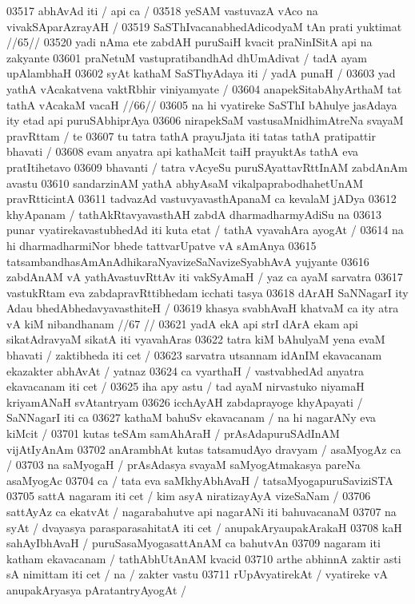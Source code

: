 03517 abhAvAd iti / api ca /  
03518 	yeSAM vastuvazA vAco na vivakSAparAzrayAH /
03519 	SaSThIvacanabhedAdicodyaM tAn prati yuktimat //65// 
03520 yadi nAma ete zabdAH puruSaiH kvacit praNinISitA api na zakyante
03601 praNetuM vastupratibandhAd dhUmAdivat / tadA ayam upAlambhaH  
03602 syAt kathaM SaSThyAdaya iti / yadA punaH / 
03603 	yad yathA vAcakatvena vaktRbhir viniyamyate / 
03604 	anapekSitabAhyArthaM tat tathA vAcakaM vacaH //66//
03605 na hi vyatireke SaSThI bAhulye jasAdaya ity etad api  puruSAbhiprAya
03606 nirapekSaM vastusaMnidhimAtreNa svayaM pravRttam / te
03607 tu tatra tathA prayuJjata iti tatas tathA pratipattir bhavati /
03608 evam anyatra api kathaMcit taiH prayuktAs tathA eva pratItihetavo  
03609 bhavanti / tatra vAcyeSu puruSAyattavRttInAM zabdAnAm avastu 
03610 sandarzinAM yathA abhyAsaM vikalpaprabodhahetUnAM pravRtticintA  
03611 tadvazAd vastuvyavasthApanaM ca kevalaM jADya  
03612 khyApanam / tathAkRtavyavasthAH zabdA dharmadharmyAdiSu na  
03613 punar vyatirekavastubhedAd iti kuta etat / tathA vyavahAra ayogAt /
03614 na hi dharmadharmiNor bhede tattvarUpatve vA sAmAnya
03615 tatsambandhasAmAnAdhikaraNyavizeSaNavizeSyabhAvA yujyante
03616 zabdAnAM vA yathAvastuvRttAv iti vakSyAmaH /  yaz ca ayaM sarvatra
03617 vastukRtam eva zabdapravRttibhedam icchati tasya  
03618 	dArAH SaNNagarI ity Adau bhedAbhedavyavasthiteH / 
03619 	khasya svabhAvaH khatvaM ca ity atra vA kiM nibandhanam //67 //
03621 yadA ekA api strI dArA ekam api sikatAdravyaM sikatA iti vyavahAras
03622 tatra kiM bAhulyaM yena evaM bhavati / zaktibheda iti cet / 
03623 sarvatra utsannam idAnIM ekavacanam ekazakter abhAvAt / yatnaz
03624 ca vyarthaH / vastvabhedAd anyatra ekavacanam iti cet / 
03625 iha apy astu / tad ayaM nirvastuko niyamaH kriyamANaH svAtantryam 
03626 icchAyAH zabdaprayoge khyApayati / SaNNagarI iti ca
03627 kathaM bahuSv ekavacanam / na hi nagarANy eva kiMcit /
03701 kutas teSAm samAhAraH / prAsAdapuruSAdInAM vijAtIyAnAm  
03702 anArambhAt kutas tatsamudAyo dravyam / asaMyogAz ca / 
03703 na saMyogaH / prAsAdasya svayaM saMyogAtmakasya pareNa asaMyogAc 
03704 ca / tata eva saMkhyAbhAvaH / tatsaMyogapuruSaviziSTA 
03705 sattA nagaram iti cet / kim asyA niratizayAyA vizeSaNam / 
03706 sattAyAz ca ekatvAt / nagarabahutve api nagarANi iti bahuvacanaM 
03707 na syAt / dvayasya parasparasahitatA iti cet / anupakAryaupakArakaH 
03708 kaH sahAyIbhAvaH / puruSasaMyogasattAnAM ca bahutvAn  
03709 nagaram iti katham ekavacanam / tathAbhUtAnAM kvacid  
03710 arthe abhinnA zaktir asti sA nimittam iti cet / na / zakter vastu
03711 rUpAvyatirekAt / vyatireke vA anupakAryasya pAratantryAyogAt /  

